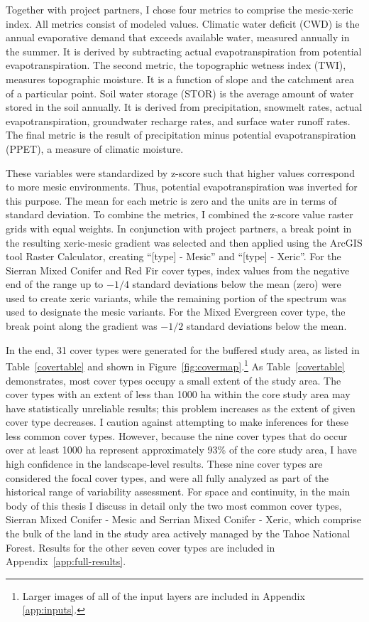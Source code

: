 Together with project partners, I chose four metrics to comprise the mesic-xeric index. All metrics consist of modeled values. Climatic water deficit (CWD) is the annual evaporative demand that exceeds available water, measured annually in the summer. It is derived by subtracting actual evapotranspiration from potential evapotranspiration. The second metric, the topographic wetness index (TWI), measures topographic moisture. It is a function of slope and the catchment area of a particular point. Soil water storage (STOR) is the average amount of water stored in the soil annually. It is derived from precipitation, snowmelt rates, actual evapotranspiration, groundwater recharge rates, and surface water runoff rates. The final metric is the result of precipitation minus potential evapotranspiration (PPET), a measure of climatic moisture.

These variables were standardized by z-score such that higher values correspond to more mesic environments. Thus, potential evapotranspiration was inverted for this purpose. The mean for each metric is zero and the units are in terms of standard deviation. To combine the metrics, I combined the z-score value raster grids with equal weights. In conjunction with project partners, a break point in the resulting xeric-mesic gradient was selected and then applied using the ArcGIS tool Raster Calculator, creating ``[type] - Mesic'' and ``[type] - Xeric''. For the Sierran Mixed Conifer and Red Fir cover types, index values from the negative end of the range up to $-1/4$ standard deviations below the mean (zero) were used to create xeric variants, while the remaining portion of the spectrum was used to designate the mesic variants. For the Mixed Evergreen cover type, the break point along the gradient was $-1/2$ standard deviations below the mean. 


In the end, 31 cover types were generated for the buffered study area, as listed in Table~\ref{covertable} and shown in Figure~\ref{fig:covermap}.\footnote{Larger images of all of the input layers are included in Appendix \ref{app:inputs}.} %
As Table~\ref{covertable} demonstrates, most cover types occupy a small extent of the study area. The cover types with an extent of less than 1000 ha within the core study area may have statistically unreliable results; this problem increases as the extent of given cover type decreases. I caution against attempting to make inferences for these less common cover types. However, because the nine cover types that do occur over at least 1000 ha represent approximately 93\% of the core study area, I have high confidence in the landscape-level results. These nine cover types are considered the focal cover types, and were all fully analyzed as part of the historical range of variability assessment. For space and continuity, in the main body of this thesis I discuss in detail only the two most common cover types, Sierran Mixed Conifer - Mesic and Serrian Mixed Conifer - Xeric, which comprise the bulk of the land in the study area actively managed by the Tahoe National Forest. Results for the other seven cover types are included in Appendix~\ref{app:full-results}. 




